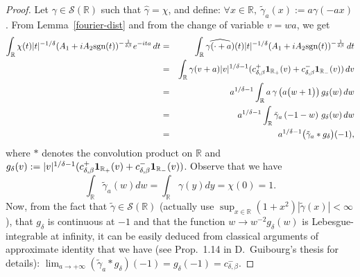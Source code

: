 \documentclass[oneside, a4paper,11pt,reqno]{amsart}
\begin{document}
\begin{proof}
Let $\gamma\in {\mathcal S}({\mathbb R})$ 
such that $\hat \gamma=\chi$, and define: $\forall x\in{\mathbb R},\ \tilde \gamma_{a}(x) := a \gamma(-ax)$.
{}From Lemma~\ref{fourier-dist} and from the change of variable $v=w a$, we get
\begin{eqnarray*}
\int_{\mathbb R} \chi(t) |t|^{-1/\delta}(A_1+iA_2\text{sgn}(t))^{-\frac 1{\delta\beta}}e^{-ita} \, dt 
&=& \int_{\mathbb R} \widehat{\gamma(\cdot+a)}(t)|t|^{-1/\delta}(A_1+iA_2\text{sgn}(t))^{-\frac 1{\delta\beta}}\, dt \\ 
&=&\int_{\mathbb R} \gamma(v+a)|v|^{1/\delta-1}(c_{\delta,\beta}^+{\bf 1}_{{\mathbb{R}}_+}(v) + c_{\delta,\beta}^{-} {\bf 1}_{{\mathbb{R}}_-}(v))\, dv\\
&=& a^{1/\delta-1}\int_{\mathbb R} a\,  \gamma\left(a\big(w+1\big)\right) g_\delta(w)\, dw\\
&=& a^{1/\delta-1}\int_{\mathbb R}\tilde \gamma_{a}\left(-1-w\right)\, g_\delta(w)\, 
dw\\
&=&  a^{1/\delta-1} \big(\tilde \gamma_{a}*g_\delta\big)(-1),
\end{eqnarray*}
where $*$ denotes the convolution product on ${\mathbb R}$ and $g_\delta(v):=|v|^{1/\delta-1}(c_{\delta,\beta}^+{\bf 1}_{{\mathbb{R}}_+}(v) + c_{\delta,\beta}^{-} {\bf 1}_{{\mathbb{R}}_-}(v)) $. Observe that we have 
$$\int_{\mathbb R}\tilde \gamma_{a}(w)dw = \int_{\mathbb R} \gamma(y)dy = \chi(0) = 1.$$
Now, from the fact that $\tilde \gamma\in{\mathcal S}({\mathbb R})$ (actually use 
$\sup_{x\in {\mathbb R}} (1+x^2)|\tilde \gamma(x)| < \infty$), that $g_\delta$ is continuous at $-1$ and that the function  $w\rightarrow w^{-2} g_\delta(w)$ is Lebesgue-integrable at infinity, it can be easily deduced from classical arguments of approximate identity that we have (see Prop.~1.14 in D.~Guibourg's thesis \cite{Gui} for details): $\lim_{a\rightarrow +\infty} (\tilde \gamma_{a}*g_\delta)(-1) = g_\delta(-1) = c_{\delta,\beta}^-$. 
\end{proof}
\end{document}

